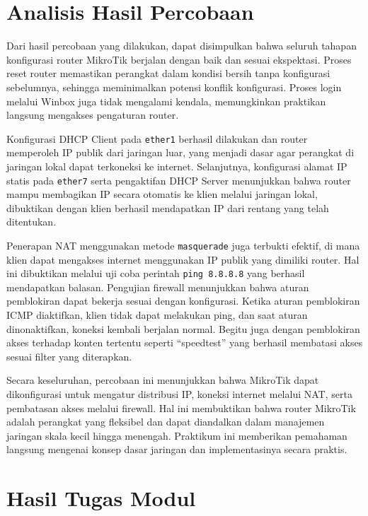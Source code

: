 \section{Analisis Hasil Percobaan}

Dari hasil percobaan yang dilakukan, dapat disimpulkan bahwa seluruh tahapan konfigurasi router MikroTik berjalan dengan baik dan sesuai ekspektasi. Proses reset router memastikan perangkat dalam kondisi bersih tanpa konfigurasi sebelumnya, sehingga meminimalkan potensi konflik konfigurasi. Proses login melalui Winbox juga tidak mengalami kendala, memungkinkan praktikan langsung mengakses pengaturan router.

Konfigurasi DHCP Client pada \texttt{ether1} berhasil dilakukan dan router memperoleh IP publik dari jaringan luar, yang menjadi dasar agar perangkat di jaringan lokal dapat terkoneksi ke internet. Selanjutnya, konfigurasi alamat IP statis pada \texttt{ether7} serta pengaktifan DHCP Server menunjukkan bahwa router mampu membagikan IP secara otomatis ke klien melalui jaringan lokal, dibuktikan dengan klien berhasil mendapatkan IP dari rentang yang telah ditentukan.

Penerapan NAT menggunakan metode \texttt{masquerade} juga terbukti efektif, di mana klien dapat mengakses internet menggunakan IP publik yang dimiliki router. Hal ini dibuktikan melalui uji coba perintah \texttt{ping 8.8.8.8} yang berhasil mendapatkan balasan. Pengujian firewall menunjukkan bahwa aturan pemblokiran dapat bekerja sesuai dengan konfigurasi. Ketika aturan pemblokiran ICMP diaktifkan, klien tidak dapat melakukan ping, dan saat aturan dinonaktifkan, koneksi kembali berjalan normal. Begitu juga dengan pemblokiran akses terhadap konten tertentu seperti “speedtest” yang berhasil membatasi akses sesuai filter yang diterapkan.

Secara keseluruhan, percobaan ini menunjukkan bahwa MikroTik dapat dikonfigurasi untuk mengatur distribusi IP, koneksi internet melalui NAT, serta pembatasan akses melalui firewall. Hal ini membuktikan bahwa router MikroTik adalah perangkat yang fleksibel dan dapat diandalkan dalam manajemen jaringan skala kecil hingga menengah. Praktikum ini memberikan pemahaman langsung mengenai konsep dasar jaringan dan implementasinya secara praktis.

\section{Hasil Tugas Modul}
